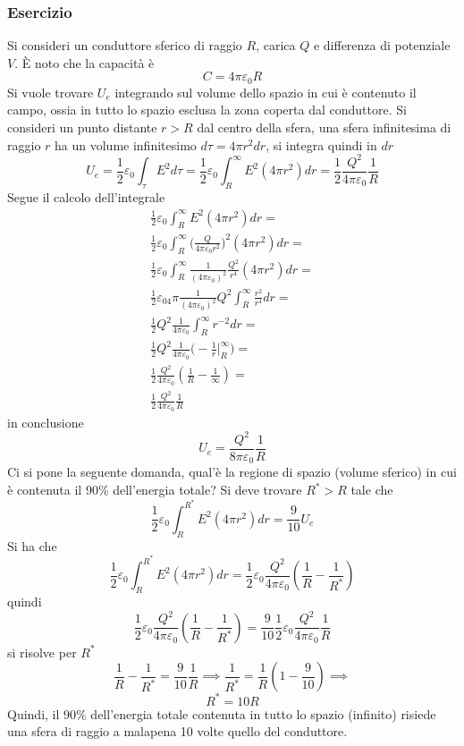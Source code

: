\documentclass[10pt, letterpaper]{report}
\begin{document}
\subsubsection{Esercizio}
Si consideri un conduttore sferico di raggio $R$, carica $Q$ e differenza di potenziale $V$. È noto che la capacità è $$ C=4\pi\varepsilon_0R$$
Si vuole trovare $U_e$ integrando sul volume dello spazio in cui è contenuto il campo, ossia in tutto lo spazio esclusa la zona coperta dal conduttore.\acc 
Si consideri un punto distante $r>R$ dal centro della sfera, una sfera infinitesima di raggio $r$ ha un volume infinitesimo $d\tau=4\pi r^2dr$, si integra quindi in $dr$ 
$$ U_e=\frac{1}{2}\varepsilon_0\int_\tau E^2d\tau = \frac{1}{2}\varepsilon_0\int_R^\infty E^2(4\pi r^2)dr=\frac{1}{2}\frac{Q^2}{4\pi\varepsilon_0}\frac{1}{R}$$
Segue il calcolo dell'integrale
\begin{eqnarray}
    \frac{1}{2}\varepsilon_0\int_R^\infty E^2(4\pi r^2)dr=\\ 
    \frac{1}{2}\varepsilon_0\int_R^\infty \Big( \frac{Q}{4\pi\varepsilon_0r^2} \Big)^2(4\pi r^2)dr=\\ 
    \frac{1}{2}\varepsilon_0\int_R^\infty \frac{1}{(4\pi\varepsilon_0)^2}\frac{Q^2}{r^4}(4\pi r^2)dr=\\ 
   \frac{1}{2}\varepsilon_04\pi\frac{1}{(4\pi\varepsilon_0)^2}Q^2\int_R^\infty\frac{r^2}{r^4}dr=\\ 
   \frac{1}{2}Q^2\frac{1}{4\pi\varepsilon_0}\int_R^\infty r^{-2}dr = \\
   \frac{1}{2}Q^2\frac{1}{4\pi\varepsilon_0}\Big(-\frac{1}{r}\Bigg |_R^\infty\Big) = \\ 
   \frac{1}{2}\frac{Q^2}{4\pi\varepsilon_0}(\frac{1}{R}-\frac{1}{\infty})= \\
   \frac{1}{2}\frac{Q^2}{4\pi\varepsilon_0}\frac{1}{R}
\end{eqnarray}
in conclusione
$$U_e  =\frac{Q^2}{8\pi\varepsilon_0}\frac{1}{R}$$
Ci si pone la seguente domanda, qual'è la regione di spazio (volume sferico) in cui è contenuta il 90\% dell'energia totale? Si deve trovare $R^*>R$ tale che 
$$ \frac{1}{2}\varepsilon_0\int_{R}^{R^*} E^2(4\pi r^2)dr=\frac{9}{10}U_e$$
Si ha che 
$$\frac{1}{2}\varepsilon_0\int_{R}^{R^*} E^2(4\pi r^2)dr=\frac{1}{2}\varepsilon_0\frac{Q^2}{4\pi\varepsilon_0}(\frac{1}{R}-\frac{1}{R^*}) $$
quindi 
$$ \frac{1}{2}\varepsilon_0\frac{Q^2}{4\pi\varepsilon_0}(\frac{1}{R}-\frac{1}{R^*}) =\frac{9}{10}
\frac{1}{2}\varepsilon_0\frac{Q^2}{4\pi\varepsilon_0}\frac{1}{R} $$
si risolve per $R^*$
$$ \frac{1}{R}-\frac{1}{R^*}=\frac{9}{10}\frac{1}{R}\implies \frac{1}{R^*}=\frac{1}{R}(1-\frac{9}{10})\implies$$
$$ R^*=10R$$
Quindi, il 90\% dell'energia totale contenuta in tutto lo spazio (infinito) risiede una sfera di raggio a malapena 10 volte quello del conduttore.
\end{document}
